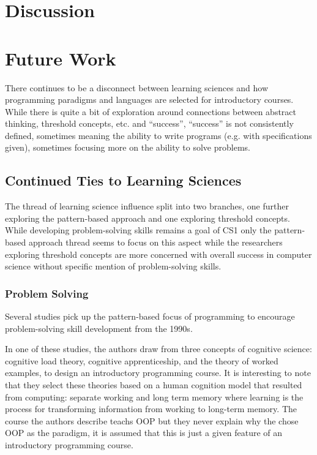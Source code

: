 \documentclass[12pt]{article}
\let\textcite=\autocite
\begin{document}

\section{Discussion}

\section{Future Work}

There continues to be a disconnect between learning sciences and how
programming paradigms and languages are selected for introductory
courses. While there is quite a bit of exploration around connections
between abstract thinking, threshold concepts, etc. and ``success'',
“success” is not consistently defined, sometimes meaning the ability
to write programs (e.g. with specifications given), sometimes focusing
more on the ability to solve problems.

\subsection{Continued Ties to Learning Sciences}

The thread of learning science influence split into two branches, one
further exploring the pattern-based approach and one exploring
threshold concepts. While developing problem-solving skills remains a
goal of CS1 only the pattern-based approach thread seems to focus on
this aspect while the researchers exploring threshold concepts are
more concerned with overall success in computer science without
specific mention of problem-solving skills.

\subsubsection{Problem Solving}

Several studies pick up the pattern-based focus of programming to
encourage problem-solving skill development from the
1990s\autocite{muller_almost_2004,muller_pattern_2005,muller_patternoriented_2007,caspersen_instructional_2007-1}.

In one of these studies, the authors draw from three concepts of
cognitive science: cognitive load theory, cognitive apprenticeship,
and the theory of worked examples, to design an introductory
programming course\autocite{caspersen_instructional_2007-1}. It is
interesting to note that they select these theories based on a human
cognition model that resulted from computing: separate working and
long term memory where learning is the process for transforming
information from working to long-term memory. The course the authors
describe teachs OOP but they never explain why the chose OOP as the
paradigm, it is assumed that this is just a given feature of an
introductory programming course.
\end{document}
